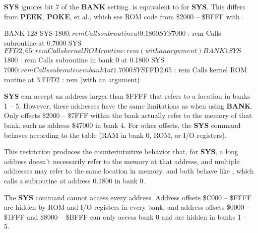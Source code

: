{\bf SYS} ignores bit 7 of the {\bf BANK} setting.  is
equivalent to  for {\bf SYS}. This differs from {\bf PEEK},
{\bf POKE}, et al., which see ROM code from \$2000 -- \$BFFF with
.

\begin{basiccode}
BANK 128
SYS $1800        : rem Calls subroutine at 0.1800
SYS $7000        : rem Calls subroutine at 0.7000
SYS $FFD2,65     : rem Calls kernel ROM routine
                 : rem (with an argument)

BANK 1
SYS $1800        : rem Calls subroutine in bank 0 at 0.1800
SYS $7000        : rem Calls subroutine in bank 1 at 1.7000
SYS $FFD2,65     : rem Calls kernel ROM routine at 3.FFD2
                 : rem (with an argument)
\end{basiccode}

{\bf SYS} can accept an address larger than \$FFFF that refers to a location
in banks 1 -- 5. However, these addresses have the same limitations as when
using {\bf BANK}. Only offsets \$2000 -- \$7FFF within the bank actually refer
to the memory of that bank, such as address \$47000 in bank 4. For other
offsets, the {\bf SYS} command behaves according to the table (RAM in bank 0,
ROM, or I/O registers).

This restriction produces the counterintuitive behavior that, for {\bf SYS}, a
long address doesn't necessarily refer to the memory at that address, and
multiple addresses may refer to the same location in memory. 
and  both behave like , which calls a
subroutine at address 0.1800 in bank 0.


The {\bf SYS} command cannot access every address. Address offsets \$C000 --
\$FFFF are hidden by ROM and I/O registers in every bank, and address offsets
\$0000 -- \$1FFF and \$8000 -- \$BFFF can only access bank 0 and are hidden in
banks 1 -- 5.

